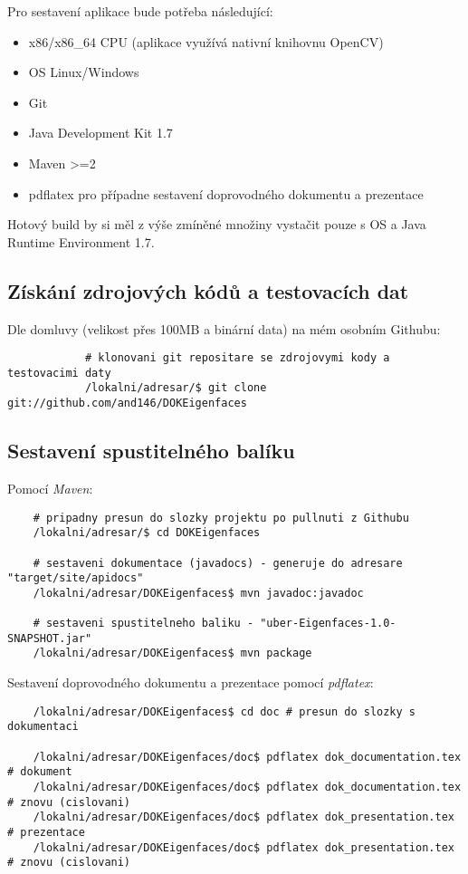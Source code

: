\documentclass[10pt,a4paper]{article}
\begin{document}
Pro sestavení aplikace bude potřeba následující:

	\begin{itemize}
		\item x86/x86\_64 CPU (aplikace využívá nativní knihovnu OpenCV)
		\item OS Linux/Windows
		\item Git
		\item Java Development Kit 1.7
		\item Maven >=2
		\item pdflatex pro případne sestavení doprovodného dokumentu a prezentace
	\end{itemize}

	Hotový build by si měl z výše zmíněné množiny vystačit pouze s OS a Java Runtime Environment 1.7.

	\subsection{Získání zdrojových kódů a testovacích dat}

		Dle domluvy (velikost přes 100MB a binární data) na mém osobním Githubu:
			\begin{verbatim}
			# klonovani git repositare se zdrojovymi kody a testovacimi daty
			/lokalni/adresar/$ git clone git://github.com/and146/DOKEigenfaces
			\end{verbatim}

\subsection{Sestavení spustitelného balíku}
    
	Pomocí \textit{Maven}:
	
    \begin{verbatim}
	# pripadny presun do slozky projektu po pullnuti z Githubu
	/lokalni/adresar/$ cd DOKEigenfaces
    
	# sestaveni dokumentace (javadocs) - generuje do adresare "target/site/apidocs"
	/lokalni/adresar/DOKEigenfaces$ mvn javadoc:javadoc 
	
	# sestaveni spustitelneho baliku - "uber-Eigenfaces-1.0-SNAPSHOT.jar"
	/lokalni/adresar/DOKEigenfaces$ mvn package 
	\end{verbatim}    
    
	Sestavení doprovodného dokumentu a prezentace pomocí \textit{pdflatex}:
	
	\begin{verbatim}
	/lokalni/adresar/DOKEigenfaces$ cd doc # presun do slozky s dokumentaci
	
	/lokalni/adresar/DOKEigenfaces/doc$ pdflatex dok_documentation.tex # dokument
	/lokalni/adresar/DOKEigenfaces/doc$ pdflatex dok_documentation.tex # znovu (cislovani)
	/lokalni/adresar/DOKEigenfaces/doc$ pdflatex dok_presentation.tex # prezentace
	/lokalni/adresar/DOKEigenfaces/doc$ pdflatex dok_presentation.tex # znovu (cislovani)
    \end{verbatim}  
    
\end{document}

